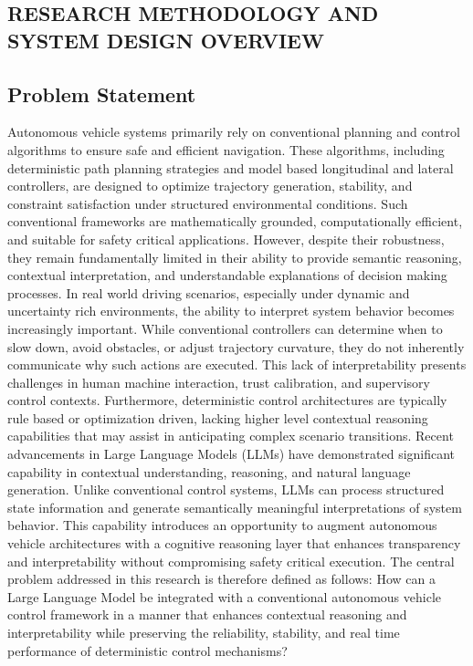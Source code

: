 \documentclass[a4paper,12pt,one side]{report}
\theoremstyle{definition}
\begin{document}
\begin{itemize}
     \chapter{RESEARCH METHODOLOGY AND SYSTEM DESIGN OVERVIEW}
\section{Problem Statement }
Autonomous vehicle \cite{wen2020scenario} systems primarily rely on conventional planning and control algorithms to ensure safe and efficient navigation. These algorithms, including deterministic path planning strategies and model based longitudinal and lateral controllers, are designed to optimize trajectory generation, stability, and constraint satisfaction under structured environmental conditions. Such conventional frameworks are mathematically grounded, computationally efficient, and suitable for safety critical applications. However, despite their robustness, they remain fundamentally limited in their ability to provide semantic reasoning, contextual interpretation, and understandable explanations of decision making processes.
In real world driving scenarios, especially under dynamic and uncertainty rich environments, the ability to interpret system behavior becomes increasingly important. While conventional controllers can determine when to slow down, avoid obstacles, or adjust trajectory curvature, they do not inherently communicate why such actions are executed. This lack of interpretability presents challenges in human machine interaction, trust calibration, and supervisory control contexts. Furthermore, deterministic control architectures are typically rule based or optimization driven, lacking higher level contextual reasoning capabilities that may assist in anticipating complex scenario transitions.
Recent advancements in Large Language Models (LLMs) have demonstrated significant capability in contextual understanding, reasoning, and natural language generation. Unlike conventional control systems, LLMs can process structured state information and generate semantically meaningful interpretations of system behavior. This capability introduces an opportunity to augment autonomous vehicle architectures with a cognitive reasoning layer that enhances transparency and interpretability without compromising safety critical execution.
The central problem addressed in this research is therefore defined as follows:
How can a Large Language Model be integrated with a conventional autonomous vehicle control framework in a manner that enhances contextual reasoning and interpretability while preserving the reliability, stability, and real time performance of deterministic control mechanisms?

\end{itemize}
\end{document}
